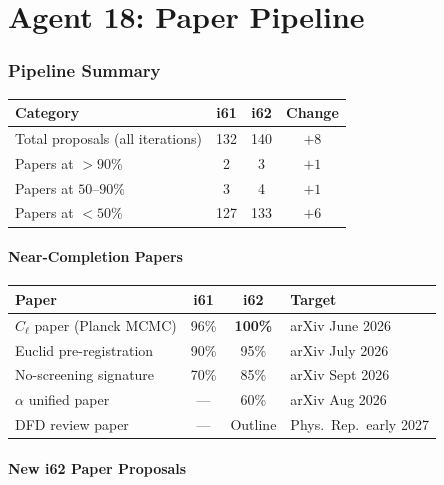 \documentclass[11pt,a4paper]{article}
\begin{document}
\part{Agent 18: Paper Pipeline}
\label{part:papers}

\section{Pipeline Summary}

\begin{center}
\begin{tabular}{lccc}
\toprule
\textbf{Category} & \textbf{i61} & \textbf{i62} & \textbf{Change} \\
\midrule
Total proposals (all iterations) & 132 & 140 & $+8$ \\
Papers at $> 90\%$ & 2 & 3 & $+1$ \\
Papers at $50$--$90\%$ & 3 & 4 & $+1$ \\
Papers at $< 50\%$ & 127 & 133 & $+6$ \\
\bottomrule
\end{tabular}
\end{center}

\subsection{Near-Completion Papers}

\begin{center}
\begin{longtable}{p{5cm}ccl}
\toprule
\textbf{Paper} & \textbf{i61} & \textbf{i62} & \textbf{Target} \\
\midrule
$C_\ell$ paper (Planck MCMC) & 96\% & \textbf{100\%} & arXiv June 2026 \\
Euclid pre-registration & 90\% & 95\% & arXiv July 2026 \\
No-screening signature & 70\% & 85\% & arXiv Sept 2026 \\
$\alpha$ unified paper & --- & 60\% & arXiv Aug 2026 \\
DFD review paper & --- & Outline & Phys.\ Rep.\ early 2027 \\
\bottomrule
\end{longtable}
\end{center}

\subsection{New i62 Paper Proposals}
\end{document}
